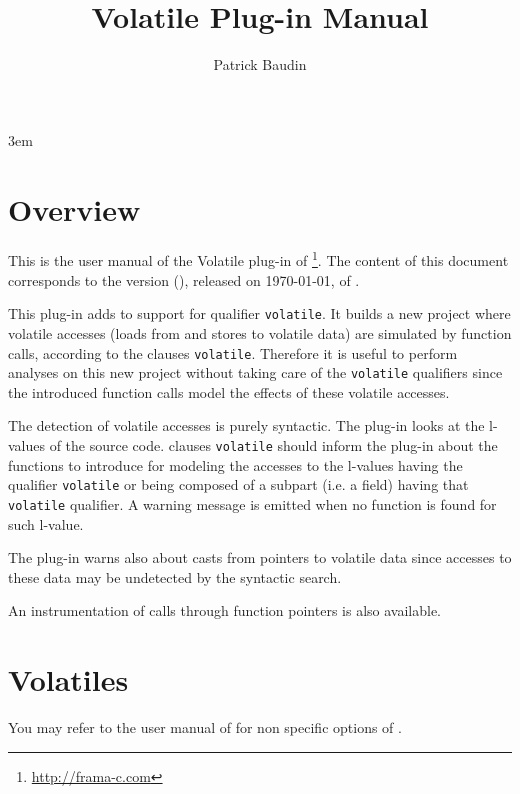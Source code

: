\documentclass{frama-c-book}
\title{Volatile Plug-in Manual}
\author{Patrick Baudin}
\newcommand{\FCVERSION}{(\unskip)}
\begin{document}
\sloppy
\emergencystretch 3em

\maketitle
\tableofcontents



\chapter{Overview}

This is the user manual of the Volatile plug-in of \FramaC\footnote{\url{http://frama-c.com}}.
The content of this document corresponds to the version \FCVERSION, released on \today, of
\FramaC.

This plug-in adds to \FramaC support for \C qualifier {\tt volatile}.
It builds a new project where volatile accesses (loads from and stores to volatile data) are simulated by function calls, according to the \acsl\cite{acsl-implem} clauses {\tt volatile}.
Therefore it is useful to perform analyses on this new project without taking care of the {\tt volatile} qualifiers since the introduced function calls model the effects of these volatile accesses.

The detection of volatile accesses is purely syntactic.
The plug-in looks at the l-values of the source code.
\acsl\cite{acsl-implem} clauses {\tt volatile} should inform the plug-in about the functions to introduce for modeling the accesses to the l-values having the qualifier {\tt volatile} or being composed of a subpart (i.e. a field) having that {\tt volatile} qualifier.
A warning message is emitted when no function is found for such l-value.

The plug-in warns also about casts from pointers to volatile data since accesses to these data may be undetected by the syntactic search.

An instrumentation of calls through function pointers is also available.


\chapter{Volatiles}

You may refer to the user manual of \FramaC \cite{userman} for non
specific options of \FramaC .
\end{document}

